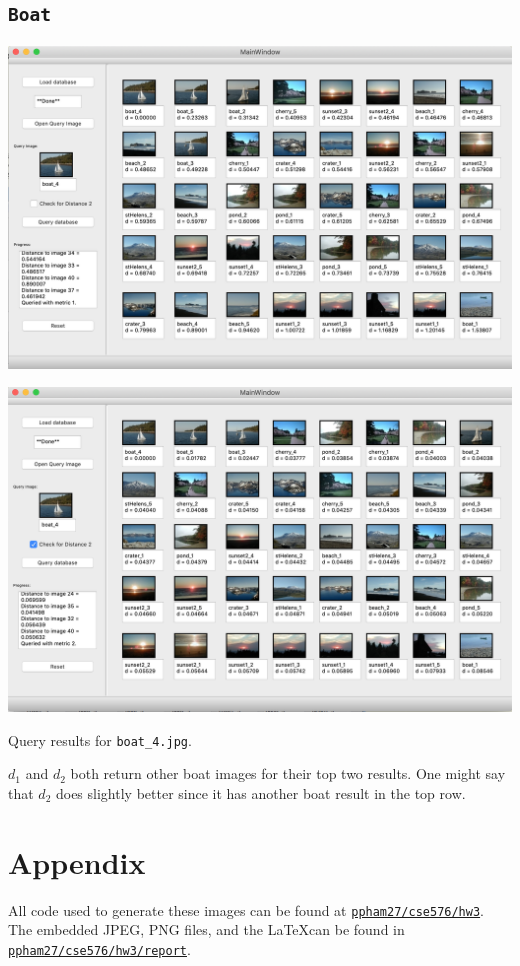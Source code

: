 \documentclass[letterpaper]{article}
\begin{document}
\subsection{\texttt{Boat}}
\begin{center}
  \includegraphics[width=\textwidth]{boat_4_distance1.png}
  
  \includegraphics[width=\textwidth]{boat_4_distance2.png}
  
  Query results for \texttt{boat\_4.jpg}.
\end{center}

$d_1$ and $d_2$ both return other boat images for their top two results. One
might say that $d_2$ does slightly better since it has another boat result in
the top row.


\section*{Appendix}

All code used to generate these images can be found at
\href{https://github.com/ppham27/cse576/blob/master/hw3}{\texttt{ppham27/cse576/hw3}}. The
embedded JPEG, PNG files, and the \LaTeX can be found in
\href{https://github.com/ppham27/cse576/blob/master/hw3/report}{\texttt{ppham27/cse576/hw3/report}}.
\end{document}
